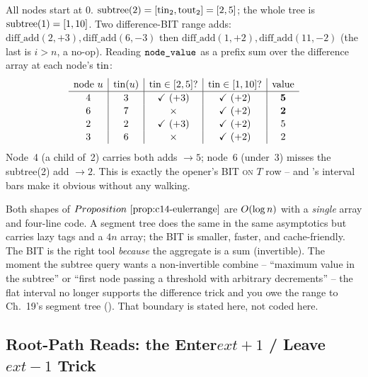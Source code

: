 \begin{tracebox}
All nodes start at \(0\).  \(\operatorname{subtree}(2)=[\operatorname{tin}_2,\operatorname{tout}_2]=[2,5]\); the whole
tree is \(\operatorname{subtree}(1)=[1,10]\).  Two difference-BIT range adds:
\(\text{diff\_add}(2,+3),\text{diff\_add}(6,-3)\) then
\(\text{diff\_add}(1,+2),\text{diff\_add}(11,-2)\) (the last is \(i>n\), a
no-op).  Reading \(\texttt{node\_value}\) as a prefix sum over the difference
array at each node's \(\operatorname{tin}\):
\[
\renewcommand{\arraystretch}{1.1}
\begin{array}{c|c|c|c|c}
\text{node }u & \tin(u) & \tin\in[2,5]? & \tin\in[1,10]? & \text{value}\\ \hline
4 & 3 & \checkmark\ (+3) & \checkmark\ (+2) & \mathbf{5}\\
6 & 7 & \times & \checkmark\ (+2) & \mathbf{2}\\
2 & 2 & \checkmark\ (+3) & \checkmark\ (+2) & 5\\
3 & 6 & \times & \checkmark\ (+2) & 2
\end{array}
\]
Node~4 (a child of~2) carries both adds \(\to5\); node~6 (under~3) misses the
subtree(2) add \(\to2\).  This is exactly the opener's \textsc{BIT on \(T\)}
row -- and 's interval bars make it obvious without any
walking.
\end{tracebox}

\begin{complexitybox}
Both shapes of \(\propref{c14-eulerrange}\) are \(O(\log n)\) with a
\emph{single} array and four-line code.  A segment tree does the same in the
same asymptotics but carries lazy tags and a \(4n\) array; the BIT is smaller,
faster, and cache-friendly.  The BIT is the right tool \emph{because} the
aggregate is a sum (invertible).  The moment the subtree query wants a
non-invertible combine -- ``maximum value in the subtree'' or ``first node
passing a threshold with arbitrary decrements'' -- the flat interval no longer
supports the difference trick and you owe the range to Ch.~19's segment tree
().  That boundary is stated here, not coded here.
\end{complexitybox}

\subsection{Root-Path Reads: the Enter\(	ext{+}1\) / Leave\(	ext{-}1\) Trick}

